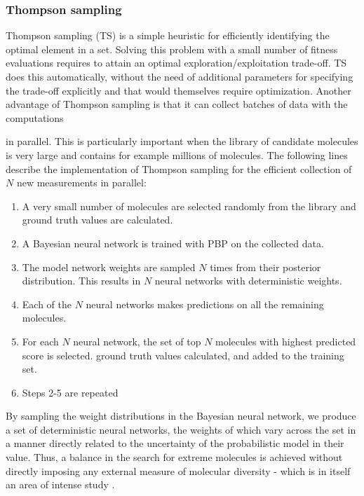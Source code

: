 \subsubsection{Thompson sampling}

Thompson sampling (TS) \cite{Thompson_1933} is a simple heuristic for efficiently identifying the optimal element in a set. Solving this problem with a small number of fitness evaluations requires to attain an optimal exploration/exploitation trade-off. TS does this automatically, without the need of additional parameters for specifying the trade-off explicitly and that would themselves require optimization. Another advantage of Thompson sampling is that it can collect batches of data with the computations

in parallel. This is 
particularly important when the library of candidate molecules is very large and contains for example millions of molecules.
The following lines describe the implementation of Thompson sampling for the efficient collection of $N$ new measurements in parallel:
\begin{enumerate}
\item A very small number of molecules are selected randomly from the library and ground truth values are calculated.
\item A Bayesian neural network is trained with PBP on the collected data.
\item The model network weights are sampled $N$ times from their posterior distribution. This results in $N$ neural networks with deterministic weights.
\item Each of the $N$ neural networks makes predictions on all the remaining molecules.
\item For each $N$ neural network, the set of top $N$ molecules with highest predicted score is selected.
ground truth values calculated, and added to the training set.
\item Steps 2-5 are repeated
\end{enumerate}
By sampling the weight distributions in the Bayesian neural network, we produce a set of deterministic neural networks, the weights of which vary across the set in a manner directly related to the uncertainty of the probabilistic model in their value.  Thus, a balance in the search for extreme molecules is achieved without directly imposing any external measure of molecular diversity - which is in itself an area of intense study \cite{Maldonado_2006}.